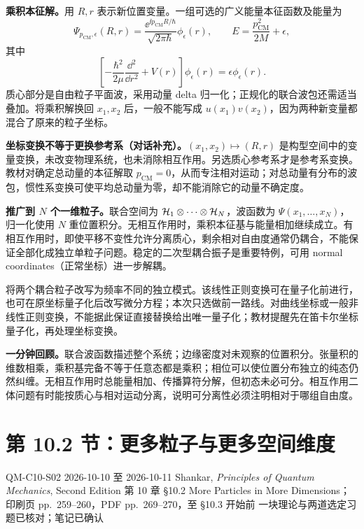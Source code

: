 \textbf{乘积本征解。}用 $R,r$ 表示新位置变量。一组可选的广义能量本征函数及能量为
\begin{equation}
  \boxed{\Psi_{p_{\mathrm{CM}},\epsilon}(R,r)
   =\frac{\ee^{\ii p_{\mathrm{CM}}R/\hbar}}{\sqrt{2\pi\hbar}}
     \phi_\epsilon(r)},\qquad
  E=\frac{p_{\mathrm{CM}}^2}{2M}+\epsilon,
\end{equation}
其中
\begin{equation}
  \left[-\frac{\hbar^2}{2\mu}\frac{\dd^2}{\dd r^2}+V(r)\right]
       \phi_\epsilon(r)=\epsilon\phi_\epsilon(r).
\end{equation}
质心部分是自由粒子平面波，采用动量 delta 归一化；正规化的联合波包还需适当叠加。将乘积解换回 $x_1,x_2$ 后，一般不能写成 $u(x_1)v(x_2)$，因为两种新变量都混合了原来的粒子坐标。

\textbf{坐标变换不等于更换参考系（对话补充）。}$(x_1,x_2)\mapsto(R,r)$ 是构型空间中的变量变换，未改变物理系统，也未消除相互作用。另选质心参考系才是参考系变换。教材对确定总动量的本征解取 $p_{\mathrm{CM}}=0$，从而专注相对运动；对总动量有分布的波包，惯性系变换可使平均总动量为零，却不能消除它的动量不确定度。

\textbf{推广到 $N$ 个一维粒子。}联合空间为 $\mathcal{H}_1\otimes\cdots\otimes\mathcal{H}_N$，波函数为 $\Psi(x_1,\ldots,x_N)$，归一化使用 $N$ 重位置积分。无相互作用时，乘积本征基与能量相加继续成立。有相互作用时，即使平移不变性允许分离质心，剩余相对自由度通常仍耦合，不能保证全部化成独立单粒子问题。稳定的二次型耦合振子是重要特例，可用 normal coordinates（正常坐标）进一步解耦。

 将两个耦合粒子改写为频率不同的独立模式。该线性正则变换可在量子化前进行，也可在原坐标量子化后改写微分方程；本次只选做前一路线。对曲线坐标或一般非线性正则变换，不能据此保证直接替换给出唯一量子化；教材提醒先在笛卡尔坐标量子化，再处理坐标变换。

\textbf{一分钟回顾。}联合波函数描述整个系统；边缘密度对未观察的位置积分。张量积的维数相乘，乘积基完备不等于任意态都是乘积；相位可以使位置分布独立的纯态仍然纠缠。无相互作用时总能量相加、传播算符分解，但初态未必可分。相互作用二体问题有时能按质心与相对运动分离，说明可分离性必须注明相对于哪组自由度。

\section{第 10.2 节：更多粒子与更多空间维度}
\label{section:QM-C10-S02}
\studymeta
  {QM-C10-S02}
  {2026-10-10 至 2026-10-11}
  {Shankar, \textit{Principles of Quantum Mechanics}, Second Edition}
  {第 10 章 \S 10.2 More Particles in More Dimensions；印刷页 pp.~259--260，PDF pp.~269--270，至 \S 10.3 开始前}
  {一块理论与两道选定习题已核对；笔记已确认}

